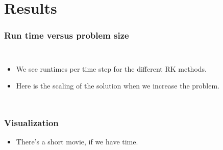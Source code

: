 \documentclass[]{beamer}
\begin{document}
\section{Results}
\begin{frame}
  \frametitle{Run time versus problem size}   %
  \begin{columns}[c]
  \column{2in}  %
  \begin{itemize}
  \item We see runtimes per time step for the different RK methods.
  \item Here is the scaling of the solution when we increase the problem.
  \end{itemize}
  \column{2in}
  \end{columns}
\end{frame}

\begin{frame}
  \frametitle{Visualization}   %
  \begin{itemize}
  \item There's a short movie, if we have time.  
  \end{itemize}
\end{frame}
	
\end{document}
